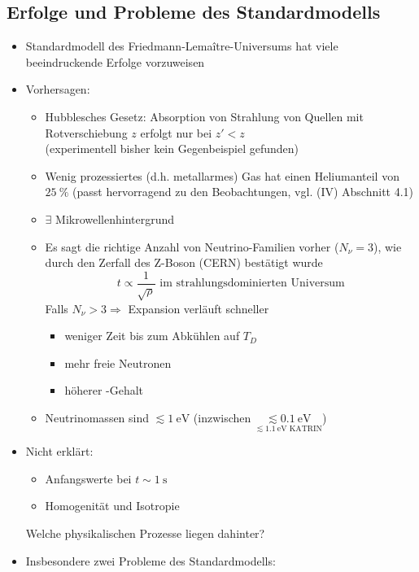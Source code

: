 \subsection{Erfolge und Probleme des Standardmodells}
\begin{itemize}
	\item Standardmodell des Friedmann-Lema\^itre-Universums hat viele beeindruckende Erfolge vorzuweisen
	\item Vorhersagen:
		\begin{itemize}[label={-}]
			\item Hubblesches Gesetz: Absorption von Strahlung von Quellen mit Rotverschiebung $z$ erfolgt nur bei $z'<z$\\
				(experimentell bisher kein Gegenbeispiel gefunden)
			\item Wenig prozessiertes (d.h. metallarmes) Gas hat einen Heliumanteil von $\SI{25}{\%}$ (passt hervorragend zu den Beobachtungen, vgl. (IV) Abschnitt 4.1)
			\item $\exists$ Mikrowellenhintergrund
			\item Es sagt die richtige Anzahl von Neutrino-Familien vorher ($N_\nu=3$), wie durch den Zerfall des Z-Boson (CERN) bestätigt wurde
				\begin{equation*}
					t\propto\frac{1}{\sqrt{\rho}}\text{ im strahlungsdominierten Universum}
				\end{equation*}
				Falls $N_\nu>3 \Rightarrow$ Expansion verläuft schneller
				\begin{itemize}[label={$\Rightarrow$}]
					\item weniger Zeit bis zum Abkühlen auf $T_D$
					\item mehr freie Neutronen
					\item höherer -Gehalt
				\end{itemize}
			\item Neutrinomassen sind $\lesssim\SI{1}{\eV}$ (inzwischen $\underset{\lesssim\SI{1.1}{\eV}\text{ KATRIN}}{\lesssim\SI{0.1}{\eV}}$)
		\end{itemize}
	\item Nicht erklärt:
		\begin{itemize}[label={\textbullet}]
			\item Anfangswerte bei $t\sim\SI{1}{\s}$
			\item Homogenität und Isotropie
		\end{itemize}
		Welche physikalischen Prozesse liegen dahinter?
	\item Insbesondere zwei Probleme des Standardmodells:

\end{itemize}
